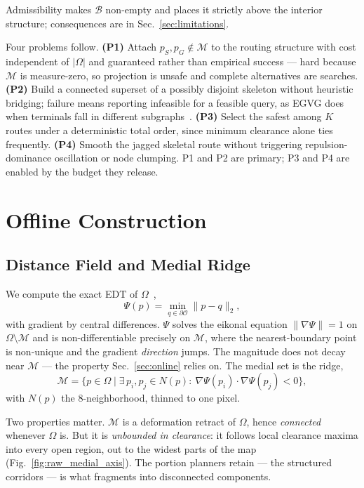 \documentclass[conference]{IEEEtran}
\begin{document}
Admissibility makes $\mathcal{B}$ non-empty and places it strictly above the interior structure; consequences are in Sec.~\ref{sec:limitations}.

Four problems follow. \textbf{(P1)} Attach $p_S,p_G\notin\mathcal{M}$ to the routing structure with cost independent of $|\Omega|$ and guaranteed rather than empirical success --- hard because $\mathcal{M}$ is measure-zero, so projection is unsafe and complete alternatives are searches. \textbf{(P2)} Build a connected superset of a possibly disjoint skeleton without heuristic bridging; failure means reporting infeasible for a feasible query, as EGVG does when terminals fall in different subgraphs~\cite{qi2025egvg}. \textbf{(P3)} Select the safest among $K$ routes under a deterministic total order, since minimum clearance alone ties frequently. \textbf{(P4)} Smooth the jagged skeletal route without triggering repulsion-dominance oscillation or node clumping. P1 and P2 are primary; P3 and P4 are enabled by the budget they release.

\section{Offline Construction}
\label{sec:offline}

\subsection{Distance Field and Medial Ridge}

We compute the exact EDT of $\Omega$~\cite{felzenszwalb2012},
\begin{equation}
\Psi(p)=\min_{q\in\partial\mathcal{O}}\|p-q\|_2 ,
\end{equation}
with gradient by central differences. $\Psi$ solves the eikonal equation $\|\nabla\Psi\|=1$ on $\Omega\setminus\mathcal{M}$ and is non-differentiable precisely on $\mathcal{M}$, where the nearest-boundary point is non-unique and the gradient \emph{direction} jumps. The magnitude does not decay near $\mathcal{M}$ --- the property Sec.~\ref{sec:online} relies on. The medial set is the ridge,
\begin{equation}
\mathcal{M}=\{p\in\Omega \mid \exists\, p_i,p_j\in N(p):\ \nabla\Psi(p_i)\cdot\nabla\Psi(p_j)<0\},
\label{eq:ridge}
\end{equation}
with $N(p)$ the $8$-neighborhood, thinned to one pixel.

Two properties matter. $\mathcal{M}$ is a deformation retract of $\Omega$, hence \emph{connected} whenever $\Omega$ is. But it is \emph{unbounded in clearance}: it follows local clearance maxima into every open region, out to the widest parts of the map (Fig.~\ref{fig:raw_medial_axis}). The portion planners retain --- the structured corridors --- is what fragments into disconnected components.
\end{document}
